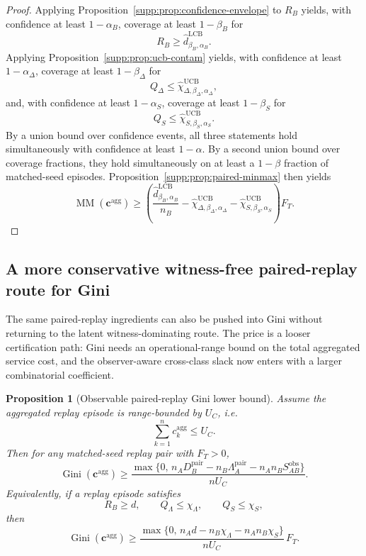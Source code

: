 \documentclass[11pt]{article}
\newcommand{\1}{\mathbf{1}}
\newcommand{\Gini}{\operatorname{Gini}}
\newcommand{\MM}{\operatorname{MM}}
\theoremstyle{definition}
\theoremstyle{plain}
\newtheorem{proposition}[definition]{Proposition}
\theoremstyle{remark}
\begin{document}
\begin{proof}
Applying Proposition~\ref{supp:prop:confidence-envelope} to $R_B$ yields, with confidence at least $1-\alpha_B$, coverage at least $1-\beta_B$ for
\[
R_B \ge \widehat d^{\mathrm{LCB}}_{\beta_B,\alpha_B}.
\]
Applying Proposition~\ref{supp:prop:ucb-contam} yields, with confidence at least $1-\alpha_\Delta$, coverage at least $1-\beta_\Delta$ for
\[
Q_\Delta \le \widehat\chi_{\Delta,\beta_\Delta,\alpha_\Delta}^{\mathrm{UCB}},
\]
and, with confidence at least $1-\alpha_S$, coverage at least $1-\beta_S$ for
\[
Q_S \le \widehat\chi_{S,\beta_S,\alpha_S}^{\mathrm{UCB}}.
\]
By a union bound over confidence events, all three statements hold simultaneously with confidence at least $1-\alpha$. By a second union bound over coverage fractions, they hold simultaneously on at least a $1-\beta$ fraction of matched-seed episodes. Proposition~\ref{supp:prop:paired-minmax} then yields
\[
\MM(\mathbf c^{\mathrm{agg}})
\ge
\left(
\frac{\widehat d^{\mathrm{LCB}}_{\beta_B,\alpha_B}}{n_B}
-
\widehat\chi_{\Delta,\beta_\Delta,\alpha_\Delta}^{\mathrm{UCB}}
-
\widehat\chi_{S,\beta_S,\alpha_S}^{\mathrm{UCB}}
\right)F_T.
\]
\end{proof}

\subsection{A more conservative witness-free paired-replay route for Gini}
\label{supp:subsec:witness-free-gini}

The same paired-replay ingredients can also be pushed into Gini without returning to the latent witness-dominating route. The price is a looser certification path: Gini needs an operational-range bound on the total aggregated service cost, and the observer-aware cross-class slack now enters with a larger combinatorial coefficient.

\begin{proposition}[Observable paired-replay Gini lower bound]
\label{supp:prop:paired-gini}
Assume the aggregated replay episode is range-bounded by $U_C$, i.e.
\[
\sum_{k=1}^n c_k^{\mathrm{agg}} \le U_C.
\]
Then for any matched-seed replay pair with $F_T>0$,
\[
\Gini(\mathbf c^{\mathrm{agg}})
\ge
\frac{\max\{0,\,
 n_A D_B^{\mathrm{pair}}
 - n_B \Lambda_A^{\mathrm{pair}}
 - n_A n_B S_{AB}^{\mathrm{obs}}
\}}{nU_C}.
\]
Equivalently, if a replay episode satisfies
\[
R_B \ge d,
\qquad
Q_\Lambda \le \chi_\Lambda,
\qquad
Q_S \le \chi_S,
\]
then
\[
\Gini(\mathbf c^{\mathrm{agg}})
\ge
\frac{\max\{0,\,
 n_A d - n_B \chi_\Lambda - n_A n_B \chi_S
\}}{nU_C}\,F_T.
\]
\end{proposition}
\end{document}
